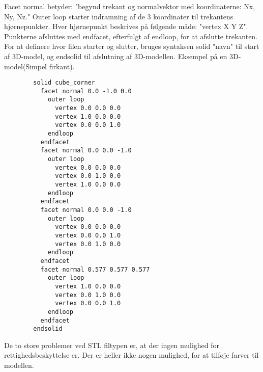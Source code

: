 \newpage

Facet normal betyder: "begynd trekant og normalvektor med koordinaterne: Nx, Ny, Nz." Outer loop starter indramning af de 3 koordinater til trekantens hjørnepunkter. Hver hjørnepunkt beskrives på følgende måde: "vertex X Y Z". Punkterne afsluttes med endfacet, efterfulgt af endloop, for at afslutte trekanten. 
For at definere hvor filen starter og slutter, bruges syntaksen solid "navn"  til start af 3D-model, og endsolid til afslutning af 3D-modellen.
Eksempel på en 3D-model(Simpel firkant)\autocite{_stla_????}.
\begin{lstlisting}
        solid cube_corner
          facet normal 0.0 -1.0 0.0
            outer loop
              vertex 0.0 0.0 0.0
              vertex 1.0 0.0 0.0
              vertex 0.0 0.0 1.0
            endloop
          endfacet
          facet normal 0.0 0.0 -1.0
            outer loop
              vertex 0.0 0.0 0.0
              vertex 0.0 1.0 0.0
              vertex 1.0 0.0 0.0
            endloop
          endfacet
          facet normal 0.0 0.0 -1.0
            outer loop
              vertex 0.0 0.0 0.0
              vertex 0.0 0.0 1.0
              vertex 0.0 1.0 0.0
            endloop
          endfacet
          facet normal 0.577 0.577 0.577
            outer loop
              vertex 1.0 0.0 0.0
              vertex 0.0 1.0 0.0
              vertex 0.0 0.0 1.0
            endloop
          endfacet
        endsolid
\end{lstlisting}
De to store problemer ved STL filtypen er, at der ingen mulighed for rettighedsbeskyttelse er. Der er heller ikke nogen mulighed, for at tilføje farver til modellen.
